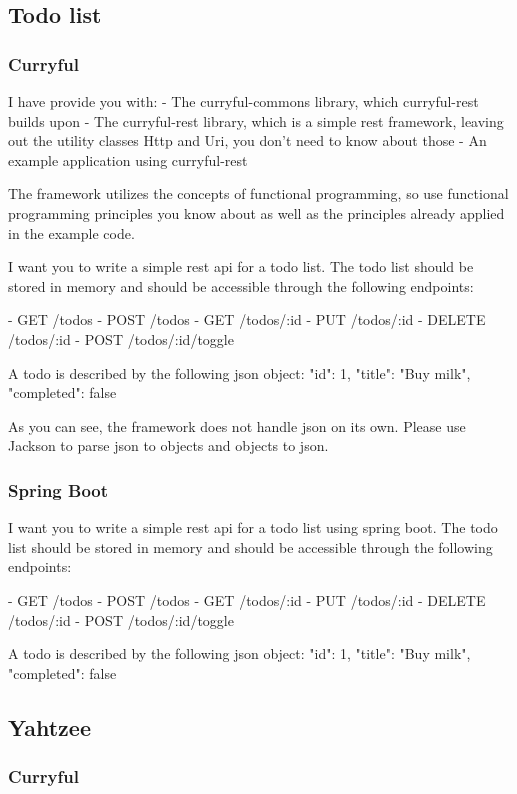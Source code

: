 \documentclass[a4paper]{article}
\begin{document}
\subsection{Todo list}
\subsubsection{Curryful}
I have provide you with:
- The curryful-commons library, which curryful-rest builds upon
- The curryful-rest library, which is a simple rest framework,
	leaving out the utility classes Http and Uri, you don't need
	to know about those
- An example application using curryful-rest

The framework utilizes the concepts of functional programming,
so use functional programming principles you know about as well as
the principles already applied in the example code.

I want you to write a simple rest api for a todo list.
The todo list should be stored in memory and should be accessible
through the following endpoints:

- GET /todos
- POST /todos
- GET /todos/:id
- PUT /todos/:id
- DELETE /todos/:id
- POST /todos/:id/toggle

A todo is described by the following json object:
{
	"id": 1,
	"title": "Buy milk",
	"completed": false
}

As you can see, the framework does not handle json on its own. Please
use Jackson to parse json to objects and objects to json.

\subsubsection{Spring Boot}
I want you to write a simple rest api for a todo list using spring boot.
    The todo list should be stored in memory and should be accessible
    through the following endpoints:

    - GET /todos
    - POST /todos
    - GET /todos/:id
    - PUT /todos/:id
    - DELETE /todos/:id
    - POST /todos/:id/toggle

    A todo is described by the following json object:
    {
      "id": 1,
      "title": "Buy milk",
      "completed": false
    }

\subsection{Yahtzee}
\subsubsection{Curryful}
\end{document}
